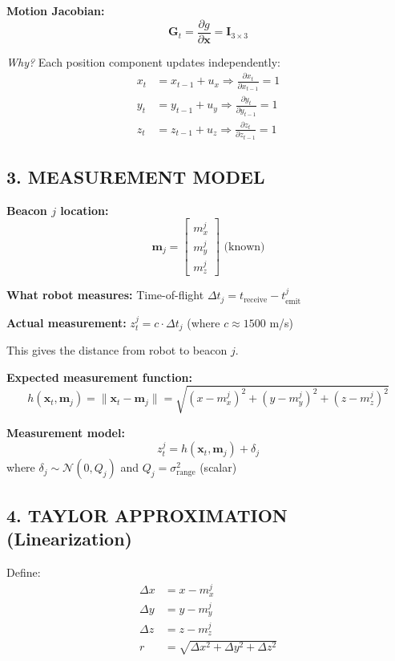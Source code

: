 \documentclass[14pt,letterpaper]{article}
\theoremstyle{definition}
\begin{document}
\textbf{Motion Jacobian:}
\[
\mathbf{G}_t = \frac{\partial g}{\partial \mathbf{x}} = \mathbf{I}_{3 \times 3}
\]

\textit{Why?} Each position component updates independently:
\begin{align*}
x_t &= x_{t-1} + u_x \Rightarrow \frac{\partial x_t}{\partial x_{t-1}} = 1 \\
y_t &= y_{t-1} + u_y \Rightarrow \frac{\partial y_t}{\partial y_{t-1}} = 1 \\
z_t &= z_{t-1} + u_z \Rightarrow \frac{\partial z_t}{\partial z_{t-1}} = 1
\end{align*}

\subsection*{3. MEASUREMENT MODEL}

\textbf{Beacon $j$ location:}
\[
\mathbf{m}_j = \begin{bmatrix} m_x^j \\ m_y^j \\ m_z^j \end{bmatrix} \text{ (known)}
\]

\textbf{What robot measures:} Time-of-flight $\Delta t_j = t_{\text{receive}} - t_{\text{emit}}^j$

\textbf{Actual measurement:} $z_t^j = c \cdot \Delta t_j$ (where $c \approx 1500$ m/s)

This gives the distance from robot to beacon $j$.

\textbf{Expected measurement function:}
\[
h(\mathbf{x}_t, \mathbf{m}_j) = \|\mathbf{x}_t - \mathbf{m}_j\| = \sqrt{(x - m_x^j)^2 + (y - m_y^j)^2 + (z - m_z^j)^2}
\]

\textbf{Measurement model:}
\[
z_t^j = h(\mathbf{x}_t, \mathbf{m}_j) + \delta_j
\]
where $\delta_j \sim \mathcal{N}(0, Q_j)$ and $Q_j = \sigma_{\text{range}}^2$ (scalar)

\subsection*{4. TAYLOR APPROXIMATION (Linearization)}

Define:
\begin{align*}
\Delta x &= x - m_x^j \\
\Delta y &= y - m_y^j \\
\Delta z &= z - m_z^j \\
r &= \sqrt{\Delta x^2 + \Delta y^2 + \Delta z^2}
\end{align*}
\end{document}
